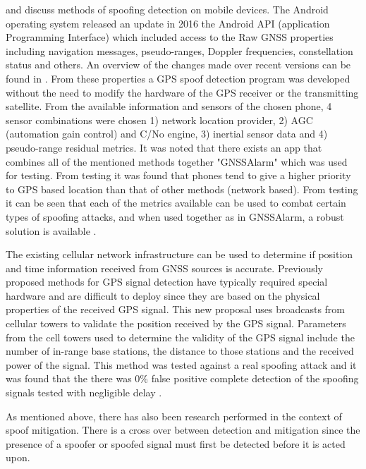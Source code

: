 \textcite{RN31} and \textcite{RN42} discuss methods of spoofing detection on mobile devices.
The Android operating system released an update in 2016 the Android API (application Programming Interface) which included access to the Raw GNSS properties including navigation messages, pseudo-ranges,
Doppler frequencies, constellation status and others. An overview of the changes made over recent versions can be found in \cite{RN39}. From these properties a GPS spoof detection program
was developed without the need to modify the hardware of the GPS receiver or the transmitting satellite. From the available information and sensors of the chosen phone, 4 sensor combinations were chosen 1) network location provider, 2) AGC (automation gain control) and C/No engine,
3) inertial sensor data and 4) pseudo-range residual metrics. It was noted that there exists an app that combines all of the mentioned methods together "GNSSAlarm" which was
used for testing. From testing it was found that phones tend to give a higher priority to GPS based location than that of other methods (network based). 
From testing it can be seen that each of the metrics available can be used to combat certain types of spoofing attacks, and when used together as in GNSSAlarm, 
a robust solution is available \cite{RN31}.

The existing cellular network infrastructure can be used to determine if position and time information received from GNSS sources is accurate. Previously
proposed methods for GPS signal detection have typically required special hardware and are difficult to deploy since they are based on the physical properties of the
received GPS signal. This new proposal uses broadcasts from cellular towers to validate the position received by the GPS signal. Parameters from the cell towers used to
determine the validity of the GPS signal include the number of in-range base stations, the distance to those stations and the received power of the signal. This method
was tested against a real spoofing attack and it was found that the there was 0\% false positive complete detection of the spoofing signals tested with negligible delay
\cite{RN42}.

As mentioned above, there has also been research performed in the context of spoof mitigation. There is a cross over between detection and mitigation since the presence of
a spoofer or spoofed signal must first be detected before it is acted upon.

